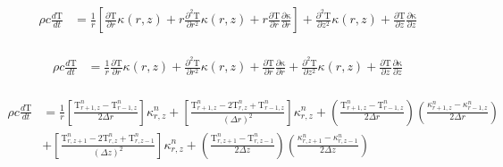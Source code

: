 \documentclass[12pt]{article}
\begin{document}
		\begin{equation}
		\begin{aligned}
		\rho c \frac{d\mathrm{T}}{dt} &= \frac{1}{r} \left [ \frac{\partial\mathrm{T}}{\partial r}\kappa(r, z) + r\frac{\partial^2\mathrm{T}}{\partial r^2}\kappa(r, z)  + r\frac{\partial\mathrm{T}}{\partial r} \frac{\partial\mathrm{\kappa}}{\partial r} \right ] + \frac{\partial^2\mathrm{T}}{\partial z^2}\kappa(r, z) + \frac{\partial\mathrm{T}}{\partial z}\frac{\partial\mathrm{\kappa}}{\partial z} \\
		\end{aligned}
		\end{equation}
		
		\begin{equation}
		\begin{aligned}
		\rho c \frac{d\mathrm{T}}{dt} &= \frac{1}{r} \frac{\partial\mathrm{T}}{\partial r}\kappa(r, z) + \frac{\partial^2\mathrm{T}}{\partial r^2}\kappa(r, z)  + \frac{\partial\mathrm{T}}{\partial r} \frac{\partial\mathrm{\kappa}}{\partial r}  + \frac{\partial^2\mathrm{T}}{\partial z^2}\kappa(r, z) + \frac{\partial\mathrm{T}}{\partial z}\frac{\partial\mathrm{\kappa}}{\partial z} \\
		\end{aligned}
		\end{equation}
		
		\begin{equation}
		\begin{aligned}
		\rho c \frac{d\mathrm{T}}{dt} &= \frac{1}{r} \left [\frac{\mathrm{T}^{n}_{r + 1, z} - \mathrm{T}^{n}_{r - 1, z}}{2\Delta r}  \right ]\kappa^{n}_{r, z} + \left [\frac{\mathrm{T}^{n}_{r + 1, z}  - 2 \mathrm{T}^{n}_{r, z} +  \mathrm{T}^{n}_{r - 1, z}}{(\Delta r)^2} \right ]  \kappa^{n}_{r, z} + (\frac{\mathrm{T}^{n}_{r + 1, z} - \mathrm{T}^{n}_{r - 1, z}}{2\Delta r}) (\frac{\kappa^{n}_{r + 1, z} - \kappa^{n}_{r - 1, z}}{2\Delta r}) \\
		&+ \left [\frac{\mathrm{T}^{n}_{r, z + 1}  - 2 \mathrm{T}^{n}_{r, z} +  \mathrm{T}^{n}_{r, z -1}}{(\Delta z)^2} \right ]\kappa^n_{r, z} + (\frac{\mathrm{T}^{n}_{r, z + 1} - \mathrm{T}^{n}_{r, z - 1}}{2\Delta z})(\frac{\kappa^{n}_{r, z + 1} - \kappa^{n}_{r,z - 1}}{2\Delta z}) \\
		\end{aligned}
		\end{equation}
		
\end{document}
